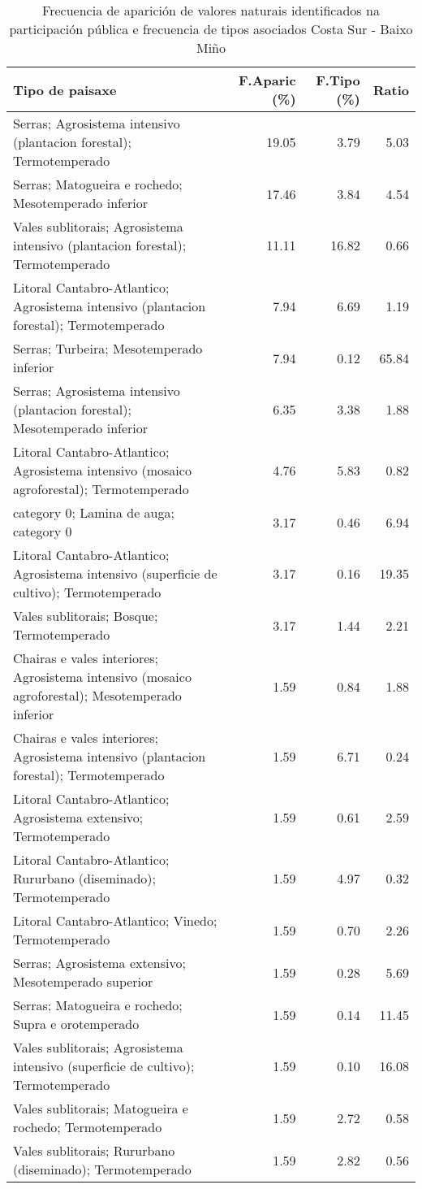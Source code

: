 \begin{table}[p]
\centering
\caption{Frecuencia de aparición de valores naturais identificados na participación pública e frecuencia de tipos asociados Costa Sur - Baixo Miño} 
\label{vsixotnat3}
\begin{tabular}{lrrr}
  \hline
Tipo de paisaxe & F.Aparic (\%) & F.Tipo (\%) & Ratio \\ 
  \hline
Serras; Agrosistema intensivo (plantacion forestal); Termotemperado & 19.05 & 3.79 & 5.03 \\ 
  Serras; Matogueira e rochedo; Mesotemperado inferior & 17.46 & 3.84 & 4.54 \\ 
  Vales sublitorais; Agrosistema intensivo (plantacion forestal); Termotemperado & 11.11 & 16.82 & 0.66 \\ 
  Litoral Cantabro-Atlantico; Agrosistema intensivo (plantacion forestal); Termotemperado & 7.94 & 6.69 & 1.19 \\ 
  Serras; Turbeira; Mesotemperado inferior & 7.94 & 0.12 & 65.84 \\ 
  Serras; Agrosistema intensivo (plantacion forestal); Mesotemperado inferior & 6.35 & 3.38 & 1.88 \\ 
  Litoral Cantabro-Atlantico; Agrosistema intensivo (mosaico agroforestal); Termotemperado & 4.76 & 5.83 & 0.82 \\ 
  category 0; Lamina de auga; category 0 & 3.17 & 0.46 & 6.94 \\ 
  Litoral Cantabro-Atlantico; Agrosistema intensivo (superficie de cultivo); Termotemperado & 3.17 & 0.16 & 19.35 \\ 
  Vales sublitorais; Bosque; Termotemperado & 3.17 & 1.44 & 2.21 \\ 
  Chairas e vales interiores; Agrosistema intensivo (mosaico agroforestal); Mesotemperado inferior & 1.59 & 0.84 & 1.88 \\ 
  Chairas e vales interiores; Agrosistema intensivo (plantacion forestal); Termotemperado & 1.59 & 6.71 & 0.24 \\ 
  Litoral Cantabro-Atlantico; Agrosistema extensivo; Termotemperado & 1.59 & 0.61 & 2.59 \\ 
  Litoral Cantabro-Atlantico; Rururbano (diseminado); Termotemperado & 1.59 & 4.97 & 0.32 \\ 
  Litoral Cantabro-Atlantico; Vinedo; Termotemperado & 1.59 & 0.70 & 2.26 \\ 
  Serras; Agrosistema extensivo; Mesotemperado superior & 1.59 & 0.28 & 5.69 \\ 
  Serras; Matogueira e rochedo; Supra e orotemperado & 1.59 & 0.14 & 11.45 \\ 
  Vales sublitorais; Agrosistema intensivo (superficie de cultivo); Termotemperado & 1.59 & 0.10 & 16.08 \\ 
  Vales sublitorais; Matogueira e rochedo; Termotemperado & 1.59 & 2.72 & 0.58 \\ 
  Vales sublitorais; Rururbano (diseminado); Termotemperado & 1.59 & 2.82 & 0.56 \\ 
   \hline
\end{tabular}
\end{table}
